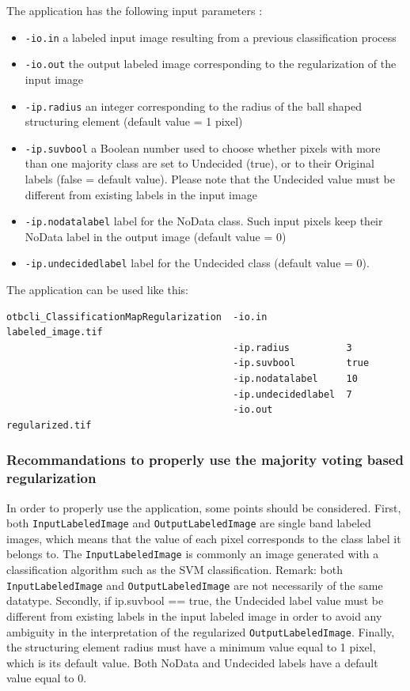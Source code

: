 The  application has the following input parameters :
\begin{itemize}
\item \verb?-io.in? a labeled input image resulting from a previous classification process
\item \verb?-io.out? the output labeled image corresponding to the regularization of the input image
\item \verb?-ip.radius? an integer corresponding to the radius of the ball shaped structuring element (default value = 1 pixel)
\item \verb?-ip.suvbool? a Boolean number used to choose whether pixels with more than one majority class are set to Undecided (true),
or to their Original labels (false = default value). Please note that the Undecided value must be different from existing labels in the input image
\item \verb?-ip.nodatalabel? label for the NoData class. Such input pixels keep their NoData label in the output image (default value = 0)
\item \verb?-ip.undecidedlabel? label for the Undecided class (default value = 0).
\end{itemize}


The application can be used like this:
\begin{verbatim}
otbcli_ClassificationMapRegularization  -io.in              labeled_image.tif
                                        -ip.radius          3
                                        -ip.suvbool         true
                                        -ip.nodatalabel     10
                                        -ip.undecidedlabel  7
                                        -io.out             regularized.tif
\end{verbatim}
 

\subsubsection{Recommandations to properly use the majority voting based regularization}

In order to properly use the  application, some points should be considered.
First, both \verb?InputLabeledImage? and \verb?OutputLabeledImage? are single band labeled images, which means that the
value of each pixel corresponds to the class label it belongs to. The \verb?InputLabeledImage? is commonly an image generated
with a classification algorithm such as the SVM classification. Remark: both
\verb?InputLabeledImage? and \verb?OutputLabeledImage? are not necessarily of the same datatype. Secondly, if ip.suvbool == true,
the Undecided label value must be different from existing labels in the input labeled image in order to avoid any ambiguity in the
interpretation of the regularized \verb?OutputLabeledImage?. Finally, the structuring element radius must have a minimum value equal to 1 pixel,
which is its default value. Both NoData and Undecided labels have a default value equal to 0.


